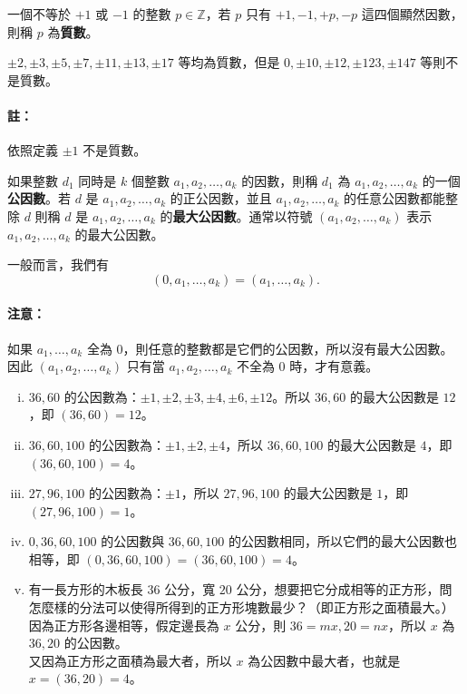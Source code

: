 \begin{definition*}
一個不等於 $+1$ 或 $-1$ 的整數 $p \in \mathbb{Z}$，若 $p$ 只有 $+1, -1, +p, -p$ 這四個顯然因數，則稱 $p$ 為\textbf{質數}。
\end{definition*}

\begin{example}\label{ex:6-1-1}
$\pm 2, \pm 3, \pm 5, \pm 7, \pm 11, \pm 13, \pm 17$ 等均為質數，但是 $0, \pm 10, \pm 12, \pm 123, \pm 147$ 等則不是質數。
\end{example}

\paragraph{註：}
依照定義 $\pm 1$ 不是質數。

\begin{definition*}
如果整數 $d_1$ 同時是 $k$ 個整數 $a_1, a_2, \dots, a_k$ 的因數，則稱 $d_1$ 為 $a_1, a_2, \dots, a_k$ 的一個\textbf{公因數}。若 $d$ 是 $a_1, a_2, \dots, a_k$ 的正公因數，並且 $a_1, a_2, \dots, a_k$ 的任意公因數都能整除 $d$ 則稱 $d$ 是 $a_1, a_2, \dots, a_k$ 的\textbf{最大公因數}。通常以符號 $(a_1, a_2, \dots, a_k)$ 表示 $a_1, a_2, \dots, a_k$ 的最大公因數。
\end{definition*}

一般而言，我們有
\begin{equation*}
  (0, a_1, \dots, a_k) = (a_1, \dots, a_k).
\end{equation*}

\paragraph{注意：}
如果 $a_1, \dots, a_k$ 全為 $0$，則任意的整數都是它們的公因數，所以沒有最大公因數。因此 $(a_1, a_2, \dots, a_k)$ 只有當 $a_1, a_2, \dots, a_k$ 不全為 $0$ 時，才有意義。

\begin{example}\label{ex:6-1-2}
\begin{enumerate}[(i)]
  \item $36, 60$ 的公因數為：$\pm 1, \pm 2, \pm 3, \pm 4, \pm 6, \pm 12$。所以 $36, 60$ 的最大公因數是 $12$，即 $(36, 60) = 12$。
  \item $36, 60, 100$ 的公因數為：$\pm 1, \pm 2, \pm 4$，所以 $36, 60, 100$ 的最大公因數是 $4$，即 $(36, 60, 100) = 4$。
  \item $27, 96, 100$ 的公因數為：$\pm 1$，所以 $27, 96, 100$ 的最大公因數是 $1$，即 $(27, 96, 100) = 1$。
  \item $0, 36, 60, 100$ 的公因數與 $36, 60, 100$ 的公因數相同，所以它們的最大公因數也相等，即 $(0, 36, 60, 100) = (36, 60, 100) = 4$。
  \item 有一長方形的木板長 $36$ 公分，寬 $20$ 公分，想要把它分成相等的正方形，問怎麼樣的分法可以使得所得到的正方形塊數最少？（即正方形之面積最大。）\\
  因為正方形各邊相等，假定邊長為 $x$ 公分，則 $36 = mx, 20 = nx$，所以 $x$ 為 $36, 20$ 的公因數。\\
  又因為正方形之面積為最大者，所以 $x$ 為公因數中最大者，也就是 $x = (36, 20) = 4$。
\end{enumerate}
\end{example}

